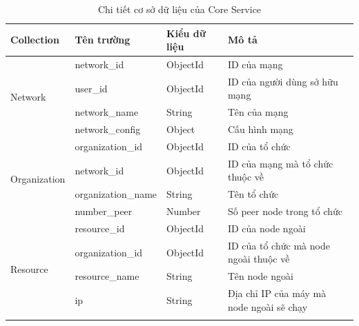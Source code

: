 \documentclass[../DoAn.tex]{subfiles}
\begin{document}
\begin{longtable}{|p{}|p{}|p{}|p{}|}
    \caption{Chi tiết cơ sở dữ liệu của Core Service}
    \label{tab:dbCoreService}                                                                                                     \\
    \hline
    Collection                                     & Tên trường         & Kiểu dữ liệu & Mô tả                                    \\ \hline
    \endhead
    \multirow[t]{4}{0.175\textwidth}{Network}      & network\_id        & ObjectId     & ID của mạng                              \\ \cline{2-4}
                                                   & user\_id           & ObjectId     & ID của người dùng sở hữu mạng            \\ \cline{2-4}
                                                   & network\_name      & String       & Tên của mạng                             \\ \cline{2-4}
                                                   & network\_config    & Object       & Cấu hình mạng                            \\ \hline
    \multirow[t]{4}{0.175\textwidth}{Organization} & organization\_id   & ObjectId     & ID của tổ chức                           \\ \cline{2-4}
                                                   & network\_id        & ObjectId     & ID của mạng mà tổ chức thuộc về          \\ \cline{2-4}
                                                   & organization\_name & String       & Tên tổ chức                              \\ \cline{2-4}
                                                   & number\_peer       & Number       & Số peer node trong tổ chức               \\ \hline
    \multirow[t]{5}{0.175\textwidth}{Resource}     & resource\_id       & ObjectId     & ID của node ngoài                        \\ \cline{2-4}
                                                   & organization\_id   & ObjectId     & ID của tổ chức mà node ngoài thuộc về    \\ \cline{2-4}
                                                   & resource\_name     & String       & Tên node ngoài                           \\ \cline{2-4}
                                                   & ip                 & String       & Địa chỉ IP của máy mà node ngoài sẽ chạy \\ \cline{2-4}

\end{longtable}
\end{document}
